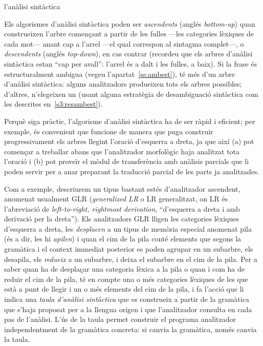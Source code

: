 \begin{persabermes}{l'anàlisi sintàctica}  

Els algorismes d'anàlisi sintàctica poden ser {\em
  ascendents} (anglés \emph{bottom-up}) quan construeixen l'arbre
començant a partir de les fulles ---les categories lèxiques de cada
mot--- anant cap a l'arrel ---el qual correspon al sintagma
complet---, o \emph{descendents} (anglés \emph{top-down}), en cas
contrar (recordeu que els arbres d'anàlisi sintàctica estan
  ``cap per avall'': l'arrel és a dalt i les fulles, a baix). Si la
frase és estructuralment ambigua (vegeu l'apartat~\ref{ss:ambest}), té
més d'un arbre d'anàlisi sintàctica: alguns analitzadors produeixen
tots els arbres possibles; d'altres, n'elegeixen un (usant alguna
estratègia de desambiguació sintàctica com les descrites
en~\ref{s3:resambest}).

Perquè siga pràctic, l'algorisme d'anàlisi sintàctica ha de ser ràpid
i eficient; per exemple, és convenient que funcione de manera que puga
construir progressivament els arbres llegint l'oració d'esquerra a
dreta, ja que així (a) pot començar a treballar abans que l'analitzador
morfològic haja analitzat tota l'oració i (b) pot proveïr el mòdul de
transferència amb anàlisis parcials que li poden servir per a anar
preparant la traducció parcial de les parts ja analitzades.

Com a exemple, descriurem un tipus bastant estés d'analitzador
ascendent, anomenat usualment GLR (\emph{generalized LR} o LR
generalitzat, on LR és l'abreviació de \emph{left-to-right, rightmost
  derivation}, ``d'esquerra a dreta i amb derivació per la dreta'').
Els analitzadors GLR lligen les categories lèxiques d'esquerra a
dreta, les \emph{desplacen} a un tipus de memòria especial anomenat
pila (és a dir, les hi \emph{apilen}) i quan el cim de la pila conté
elements que segons la gramàtica i el context immediat posterior es
poden agrupar en un subarbre, els desapila, els \emph{redueix} a un
subarbre, i deixa el subarbre en el cim de la pila. Per a saber quan
ha de desplaçar una categoria lèxica a la pila o quan i com ha de
reduir el cim de la pila, té en compte una o més categories lèxiques
de les que està a punt de llegir i un o més elements del cim de la
pila, i fa l'acció que li indica una \emph{taula d'anàlisi sintàctica}
que es construeix a partir de la gramàtica que s'haja proposat per a
la llengua origen i que l'analitzador consulta en cada pas de
l'anàlisi. L'ús de la taula permet construir el programa analitzador
independentment de la gramàtica concreta: si canvia la gramàtica,
només canvia la taula.


\end{persabermes}
